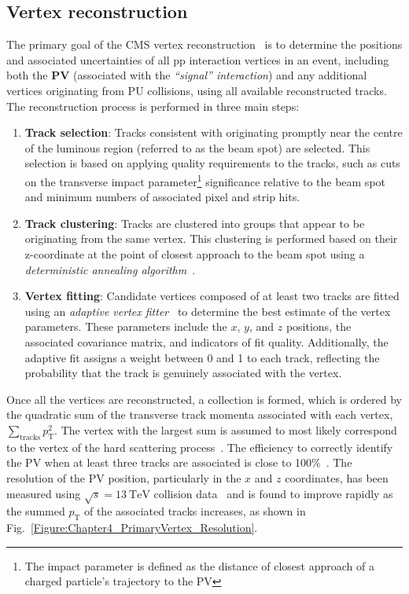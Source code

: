 \subsection{Vertex reconstruction}
\label{Section:Chapter4_Vertex_reconstruction}

The primary goal of the \ac{CMS} vertex reconstruction~\cite{CMS_TrackerPerformance_2014} is to determine the positions and associated uncertainties of all pp interaction vertices in an event, including both the \textbf{\ac{PV}} (associated with the \textit{``signal'' interaction}) and any additional vertices originating from \ac{PU} collisions, using all available reconstructed tracks. The reconstruction process is performed in three main steps: 

\begin{enumerate}
    \item \textbf{Track selection}: Tracks consistent with originating promptly near the centre of the luminous region (referred to as the beam spot) are selected. This selection is based on applying quality requirements to the tracks, such as cuts on the transverse impact parameter\footnote{The impact parameter is defined as the distance of closest approach of a charged particle’s trajectory to the \ac{PV}} significance relative to the beam spot and minimum numbers of associated pixel and strip hits.
    \item \textbf{Track clustering}: Tracks are clustered into groups that appear to be originating from the same vertex. This clustering is performed based on their z-coordinate at the point of closest approach to the beam spot using a \textit{deterministic annealing algorithm}~\cite{DeterministicAnnealing}.
    \item \textbf{Vertex fitting}: Candidate vertices composed of at least two tracks are fitted using an \textit{adaptive vertex fitter}~\cite{VertexFitting_2006,VertexFitting_2007} to determine the best estimate of the vertex parameters. These parameters include the $x$, $y$, and $z$ positions, the associated covariance matrix, and indicators of fit quality. Additionally, the adaptive fit assigns a weight between 0 and 1 to each track, reflecting the probability that the track is genuinely associated with the vertex.
\end{enumerate}

Once all the vertices are reconstructed, a collection is formed, which is ordered by the quadratic sum of the transverse track momenta associated with each vertex, $\sum_{\text{tracks}} p_{\mathrm{T}}^2$. The vertex with the largest sum is assumed to most likely correspond to the vertex of the hard scattering process~\cite{ParticleFlow}. The efficiency to correctly identify the \ac{PV} when at least three tracks are associated is close to 100\%~\cite{CMS_TrackerPerformance_2014}. The resolution of the \ac{PV} position, particularly in the $x$ and $z$ coordinates, has been measured using $\sqrt{s} = 13\ \mathrm{TeV}$ collision data~\cite{PrimaryVertex_Resolution} and is found to improve rapidly as the summed $p_{\mathrm{T}}$ of the associated tracks increases, as shown in Fig.~\ref{Figure:Chapter4_PrimaryVertex_Resolution}.

